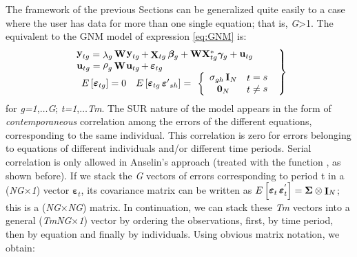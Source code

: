 \documentclass[article]{jss}
\begin{document}
The framework of the previous Sections can be generalized quite easily to a case where the user has data for more than one single equation; that is, \emph{G}\textgreater{}1. The equivalent to the GNM model of expression \eqref{eq:GNM} is:
\begin{equation}
\left.\begin{array}{lll}
{\mathop{{\bf y}}\nolimits_{tg} =\mathop{\lambda }\nolimits_{g} {\bf W} \mathop{{\bf y}}\nolimits_{tg} +\mathop{{\bf X}}\nolimits_{tg} {\boldsymbol \beta}_{g}+{\bf W} {\bf X}_{tg}^* {\boldsymbol \gamma}_{g}+\mathop{{\bf u}}\nolimits_{tg} } \\
{\mathop{{\bf u}}\nolimits_{tg} =\mathop{\rho }\nolimits_{g} {\bf W} \mathop{{\bf u}}\nolimits_{tg} +\mathop{{\boldsymbol \varepsilon}}\nolimits_{tg} }\\
\begin{array}{cc} {E\left[\mathop{{\boldsymbol \varepsilon}}\nolimits_{tg} \right]=0} & {E\left[\mathop{{\boldsymbol \varepsilon}}\nolimits_{\mathop{tg}} \mathop{{\boldsymbol \varepsilon}'}\nolimits_{\mathop{sh}} \right]=}
\end{array}\left\{\begin{array}{cc} {\mathop{\sigma}\nolimits_{gh} {\bf I}_{N}} & {\mathop{t} = \mathop{s}} \\ {{\bf 0}_{N} } & {\mathop{t} \ne \mathop{s} }
\end{array}\right.
\end{array}\right\}
\label{eq:sure}
\end{equation}
for \emph{g=1},\(\ldots\)\emph{G}; \emph{t=1},\(\ldots\)\emph{Tm}. The SUR nature of the model appears in the form of \emph{contemporaneous} correlation among the errors of the different equations, corresponding to the same individual. This correlation is zero for errors belonging to equations of different individuals and/or different time periods. Serial correlation is only allowed in Anselin's approach (treated with the function , as shown before). If we stack the \emph{G} vectors of errors corresponding to period t in a (\emph{NG}\(\times\)\emph{1}) vector \({\boldsymbol \varepsilon}_{t}\), its covariance matrix can be written as \(E\left[\mathop{{\boldsymbol \varepsilon}}\nolimits_{t} \mathop{{\boldsymbol \varepsilon}}\nolimits_{t}^{'} \right]= {\boldsymbol \Sigma} \otimes \mathop{{\bf I}}\nolimits_{N}\); this is a (\emph{NG}\(\times\)\emph{NG}) matrix. In continuation, we can stack these \emph{Tm} vectors into a general (\emph{TmNG}\(\times\)\emph{1}) vector by ordering the observations, first, by time period, then by equation and finally by individuals. Using obvious matrix notation, we obtain:
\end{document}
